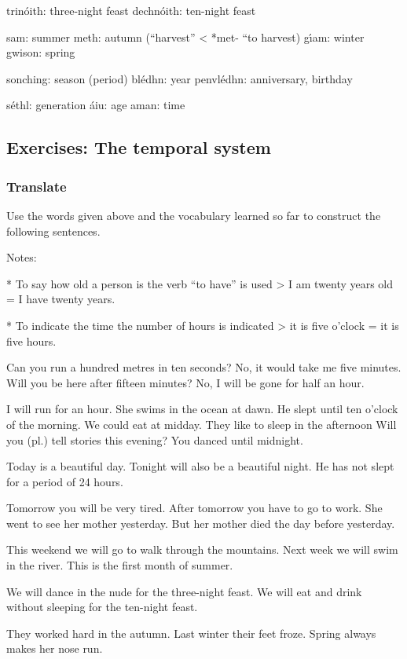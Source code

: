 trin\'{o}ith: three-night feast
dechn\'{o}ith: ten-night feast

sam: summer
meth: autumn (“harvest” < *met- “to harvest)
g\'{\i}am: winter
gwison: spring

sonching: season (period)
bl\'{e}dhn: year
penvl\'{e}dhn: anniversary, birthday

s\'{e}thl: generation
\'{a}iu: age
aman: time

\subsection{Exercises: The temporal system}

\subsubsection{Translate}

Use the words given above and the vocabulary learned so far to construct the following sentences.

Notes: 

* To say how old a person is the verb “to have” is used > I am twenty years old = I have twenty years. 

* To indicate the time the number of hours is indicated > it is five o’clock = it is five hours.

Can you run a hundred metres in ten seconds?
No, it would take me five minutes.
Will you be here after fifteen minutes?
No, I will be gone for half an hour.

I will run for an hour.
She swims in the ocean at dawn.
He slept until ten o’clock of the morning.
We could eat at midday.
They like to sleep in the afternoon
Will you (pl.) tell stories this evening?
You danced until midnight.

Today is a beautiful day.
Tonight will also be a beautiful night.
He has not slept for a period of 24 hours.

Tomorrow you will be very tired.
After tomorrow you have to go to work.
She went to see her mother yesterday.
But her mother died the day before yesterday.

This weekend we will go to walk through the mountains.
Next week we will swim in the river.
This is the first month of summer.

We will dance in the nude for the three-night feast.
We will eat and drink without sleeping for the ten-night feast.

They worked hard in the autumn.
Last winter their feet froze.
Spring always makes her nose run.

